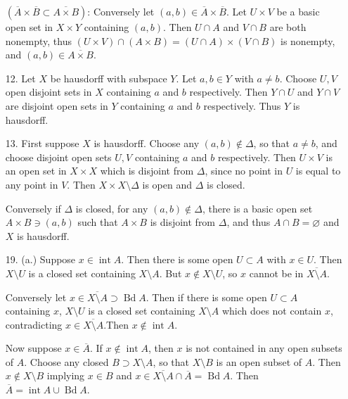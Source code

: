 \documentclass[11pt, reqno]{article}
\theoremstyle{plain}
\theoremstyle{definition}
\theoremstyle{remark}
\renewcommand{\emptyset}{\varnothing}
\begin{document}
\begin{enumerate}
    $(\overline{A} \times \overline{B} \subset \overline{A \times B})$: 
    Conversely let $(a,b) \in \overline{A} \times\overline{B}$. Let $U \times V$ be 
    a basic open set in $X \times Y$ containing $(a,b)$. Then $U \cap A$ and $V \cap B$
    are both nonempty, thus $(U \times V) \cap (A \times B) = (U \cap A) \times (V \cap B)$
    is nonempty, and $(a,b) \in \overline{A \times B}$.

    \item[12.] Let $X$ be hausdorff with subspace $Y$. Let $a, b \in Y$ with $a \neq b$. 
    Choose $U, V$ open disjoint sets in $X$ containing $a$ and $b$ respectively. Then
    $Y \cap U$ and $Y \cap V$ are disjoint open sets in $Y$ containing $a$ and $b$ respectively.
    Thus $Y$ is hausdorff.

    \item[13.] First suppose $X$ is hausdorff. Choose any $(a,b) \notin \Delta$, so
    that $a \neq b$, and choose disjoint open sets $U, V$ containing $a$ and $b$ respectively.
    Then $U \times V$ is an open set in $X \times X$ which is disjoint from $\Delta$, since 
    no point in $U$ is equal to any point in $V$. Then $X \times X \setminus \Delta$ is open and 
    $\Delta$ is closed.

    Conversely if $\Delta$ is closed, for any $(a,b) \notin \Delta$, there is a basic open set 
    $A \times B \ni (a,b)$ such that $A \times B$ is disjoint from $\Delta$, and thus 
    $A \cap B = \emptyset$ and $X$ is hausdorff. 

    \item[19.] (a.) Suppose $x \in \operatorname{int}A$. Then there is some open $U \subset A$ with 
    $x \in U$. Then $X \setminus U$ is a closed set containing $X \setminus A$. But $x \notin X\setminus U$,
    so $x$ cannot be in $\overline{X \setminus A}$.

    Conversely let $x \in \overline{X \setminus A} \supset \operatorname{Bd}A$. Then if there is some open $U \subset A$ containing $x$,
    $X \setminus U$ is a closed set containing $X \setminus A$ which does not contain $x$, contradicting
    $x \in \overline{X \setminus A}$.Then $x \notin \operatorname{int} A$.

    Now suppose $x \in \overline{A}$. If $x \notin \operatorname{int}A$, then $x$ is not contained 
    in any open subsets of $A$. Choose any closed $B \supset X\setminus A$, so that $X \setminus B$
    is an open subset of $A$. Then $x \notin X \setminus B$ implying $x \in B$ and $x \in \overline{X \setminus A} \cap \overline{A} =
    \operatorname{Bd} A$. Then $\overline{A} = \operatorname{int} A \cup \operatorname{Bd} A$.


\end{enumerate}
\end{document}
